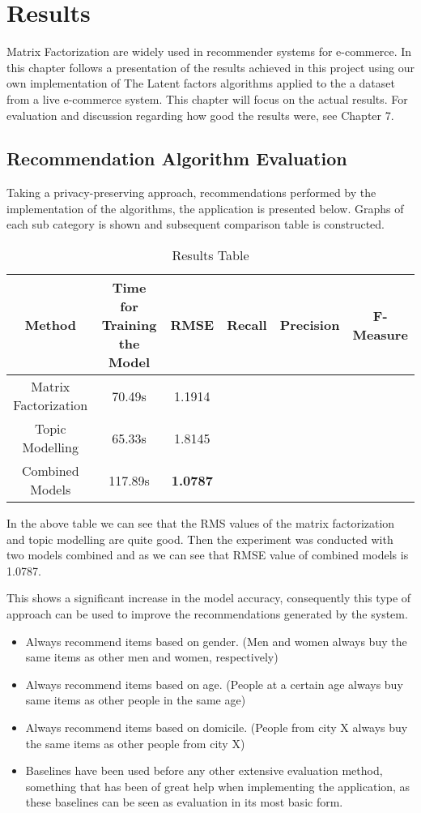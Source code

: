\chapter{Results}
Matrix Factorization are widely used in recommender systems for e-commerce. In this chapter follows a presentation of the results achieved in this project using our own implementation of The Latent factors algorithms applied to the a dataset from a live e-commerce system. This chapter will focus on the actual results. For evaluation and discussion regarding how good the results were, see Chapter 7.

\section{Recommendation Algorithm Evaluation}
Taking a privacy-preserving approach, recommendations performed by the implementation of the algorithms, the application is presented below. Graphs of each sub category is shown and subsequent comparison table is constructed.

\begin{table}[h]
\centering
\begin{tabular}{| c | c | c | c | c | c |}
\hline
\textbf{Method} & \textbf{Time for Training the Model} & \textbf{RMSE} & \textbf{Recall} & \textbf{Precision} & \textbf{F-Measure} \\
\hline
Matrix Factorization & 70.49s & 1.1914 &  &    &   \\
\hline
Topic Modelling & 65.33s & 1.8145 &  &  &  \\
\hline
Combined Models & 117.89s  & \textbf{1.0787} &  &  &  \\ 
\hline          
\end{tabular}
\caption{Results Table}
\label{Results Table}
\end{table}

In the above table we can see that the RMS values of the matrix factorization and topic modelling are quite good.
Then the experiment was conducted with two models combined and as we can see that RMSE value of combined models is 1.0787.

This shows a significant increase in the model accuracy, consequently this type of approach can be used to improve the recommendations generated by the system.

\begin{itemize}
    \item Always recommend items based on gender. (Men and women always buy the same items as other men and women, respectively)
    \item Always recommend items based on age. (People at a certain age always buy same items as other people in the same age)
    \item Always recommend items based on domicile. (People from city X always buy the same items as other people from city X)
    \item Baselines have been used before any other extensive evaluation method, something that has been of great help when implementing the application, as these baselines can be seen as evaluation in its most basic form.
    
    \end{itemize}


